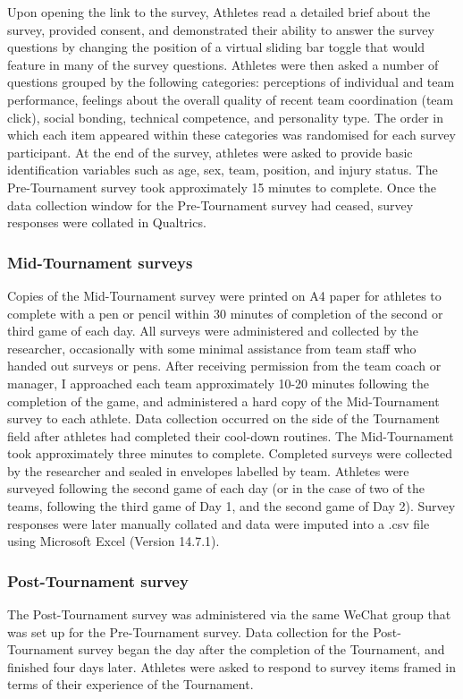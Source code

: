 \begin{CJK}{UTF8}{gbsn}
Upon opening the link to the survey, Athletes read a detailed brief about the survey, provided consent, and demonstrated their ability to answer the survey questions by changing the position of a virtual sliding bar toggle that would feature in many of the survey questions.  Athletes were then asked a number of questions grouped by the following categories: perceptions of individual and team performance, feelings about the overall quality of recent team coordination (team click), social bonding, technical competence, and personality type. The order in which each item appeared within these categories was randomised for each survey participant. At the end of the survey, athletes were asked to provide basic identification variables such as age, sex, team, position, and injury status.  The Pre-Tournament survey took approximately 15 minutes to complete.  Once the data collection window for the Pre-Tournament survey had ceased, survey responses were collated in Qualtrics.

\subsubsection{Mid-Tournament surveys}
Copies of the Mid-Tournament survey were printed on A4 paper for athletes to complete with a pen or pencil within 30 minutes of completion of the second or third game of each day. All surveys were administered and collected by the researcher, occasionally with some minimal assistance from team staff who handed out surveys or pens. After receiving permission from the team coach or manager, I approached each team approximately 10-20 minutes following the completion of the game, and administered a hard copy of the Mid-Tournament survey to each athlete.  Data collection occurred on the side of the Tournament field after athletes had completed their cool-down routines.  The Mid-Tournament took approximately three minutes to complete. Completed surveys were collected by the researcher and sealed in envelopes labelled by team. Athletes were surveyed following the second game of each day (or in the case of two of the teams, following the third game of Day 1, and the second game of Day 2).  Survey responses were later manually collated and data were imputed into a .csv file using Microsoft Excel (Version 14.7.1).

\subsubsection{Post-Tournament survey}
The Post-Tournament survey was administered via the same WeChat group that was set up for the Pre-Tournament survey. Data collection for the Post-Tournament survey began the day after the completion of the Tournament, and finished four days later. Athletes were asked to respond to survey items framed in terms of their experience of the Tournament.


\end{CJK}
